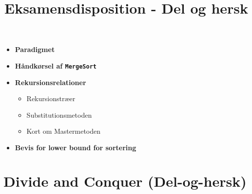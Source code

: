 
\title{Eksamensdisposition - Del og hersk}


\maketitle



\begin{itemize}
	\item \textbf{Paradigmet}
	\item \textbf{Håndkørsel af \texttt{MergeSort}}
	\item \textbf{Rekursionsrelationer}
	\begin{itemize}
		\item Rekursionstræer
		\item Substitutionsmetoden
		\item Kort om Mastermetoden
	\end{itemize}
	\item \textbf{Bevis for lower bound for sortering}
\end{itemize}




\newpage
\section{Divide and Conquer (Del-og-hersk)}


